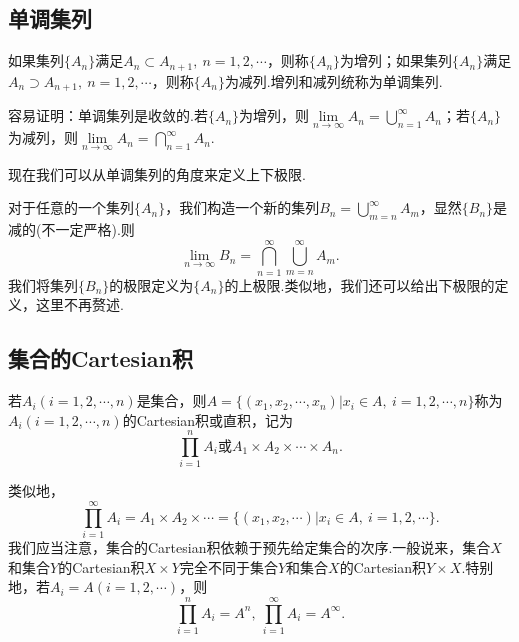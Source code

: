 \subsection{单调集列}
\begin{definition}[单调集列]
	如果集列$\{A_n\}$满足$A_n\subset A_{n+1},\ n=1,2,\cdots$，则称$\{A_n\}$为增列；如果集列$\{A_n\}$满足$A_n\supset A_{n+1},\ n=1,2,\cdots$，则称$\{A_n\}$为减列.增列和减列统称为{\heiti 单调集列}.
\end{definition}
容易证明：{\heiti 单调集列是收敛的}.若$\{A_n\}$为增列，则$\lim\limits_{n\to\infty}A_n=\bigcup\limits_{n=1}^{\infty}A_n$；若$\{A_n\}$为减列，则$\lim\limits_{n\to\infty}A_n=\bigcap\limits_{n=1}^{\infty}A_n$.

现在我们可以从单调集列的角度来定义上下极限.

对于任意的一个集列$\{A_n\}$，我们构造一个新的集列$B_n=\bigcup\limits_{m=n}^{\infty}A_m$，显然$\{B_n\}$是减的(不一定严格).则
$$\lim\limits_{n\to\infty}B_n=\bigcap\limits_{n=1}^{\infty}\bigcup\limits_{m=n}^{\infty}A_m.$$
我们将集列$\{B_n\}$的极限定义为$\{A_n\}$的上极限.类似地，我们还可以给出下极限的定义，这里不再赘述.
\subsection{集合的Cartesian积}
\begin{definition}[Cartesian积]
	若$A_i(i=1,2,\cdots,n)$是集合，则$A=\{(x_1,x_2,\cdots,x_n)|x_i\in A,\ i=1,2,\cdots,n\}$称为$A_i(i=1,2,\cdots,n)$的{\heiti Cartesian积}或{\heiti 直积}，记为
	$$\prod_{i=1}^{n}A_i\text{或}A_1\times A_2\times\cdots\times A_n.$$
\end{definition}
类似地，
$$\prod_{i=1}^{\infty}A_i=A_1\times A_2\times\cdots=\{(x_1,x_2,\cdots)|x_i\in A,\ i=1,2,\cdots\}.$$
我们应当注意，集合的Cartesian积依赖于预先给定集合的次序.一般说来，集合$X$和集合$Y$的Cartesian积$X\times Y$完全不同于集合$Y$和集合$X$的Cartesian积$Y\times X$.特别地，若$A_i=A(i=1,2,\cdots)$，则
$$\prod_{i=1}^{n}A_i=A^n,\ \prod_{i=1}^{\infty}A_i=A^{\infty}.$$

